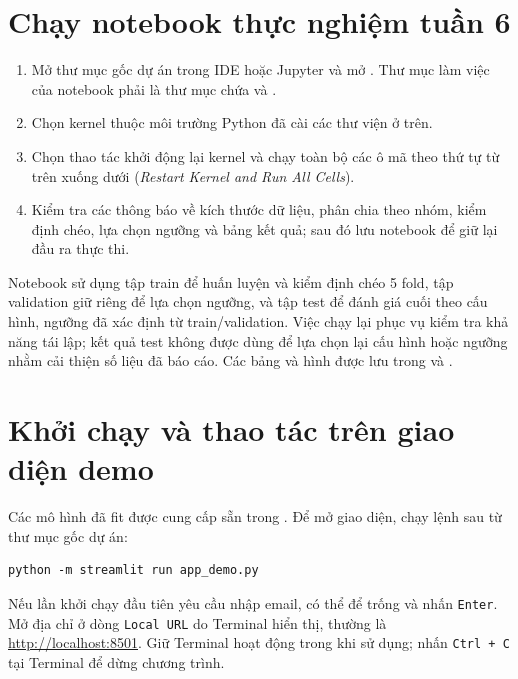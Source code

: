\documentclass[12pt,a4paper,oneside]{report}
\begin{document}
\section{Chạy notebook thực nghiệm tuần 6}

\begin{enumerate}
    \item Mở thư mục gốc dự án trong IDE hoặc Jupyter và mở
    .
    Thư mục làm việc của notebook phải là thư mục chứa
     và .
    \item Chọn kernel thuộc môi trường Python đã cài các thư viện ở trên.
    \item Chọn thao tác khởi động lại kernel và chạy toàn bộ các ô mã
    theo thứ tự từ trên xuống dưới
    (\textit{Restart Kernel and Run All Cells}).
    \item Kiểm tra các thông báo về kích thước dữ liệu, phân chia theo nhóm,
    kiểm định chéo, lựa chọn ngưỡng và bảng kết quả; sau đó lưu notebook
    để giữ lại đầu ra thực thi.
\end{enumerate}

Notebook sử dụng tập train để huấn luyện và kiểm định chéo 5 fold,
tập validation giữ riêng để lựa chọn ngưỡng, và tập test để đánh giá cuối
theo cấu hình, ngưỡng đã xác định từ train/validation.
Việc chạy lại phục vụ kiểm tra khả năng tái lập; kết quả test không được
dùng để lựa chọn lại cấu hình hoặc ngưỡng nhằm cải thiện số liệu đã báo cáo.
Các bảng và hình được lưu trong 
và .

\section{Khởi chạy và thao tác trên giao diện demo}

Các mô hình đã fit được cung cấp sẵn trong .
Để mở giao diện, chạy lệnh sau từ thư mục gốc dự án:

\begin{lstlisting}[language={},numbers=none]
python -m streamlit run app_demo.py
\end{lstlisting}

Nếu lần khởi chạy đầu tiên yêu cầu nhập email, có thể để trống và nhấn
\texttt{Enter}. Mở địa chỉ ở dòng \texttt{Local URL} do Terminal hiển thị,
thường là \url{http://localhost:8501}. Giữ Terminal hoạt động trong khi
sử dụng; nhấn \texttt{Ctrl + C} tại Terminal để dừng chương trình.
\end{document}
